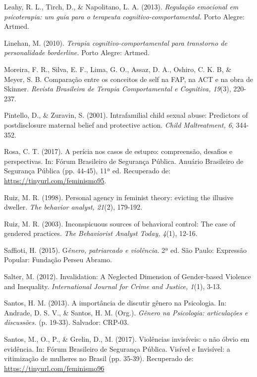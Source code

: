 \hangindent=25pt
\noindent Leahy, R. L., Tirch, D., \& Napolitano, L. A. (2013). \textit{Regulação emocional em psicoterapia: um guia para o terapeuta cognitivo-compor\-tamental.} Porto Alegre: Artmed.

\hangindent=25pt
\noindent Linehan, M. (2010). \textit{Terapia cognitivo-comportamental para transtorno de personalidade borderline.} Porto Alegre: Artmed. 

\hangindent=25pt
\noindent Moreira, F. R., Silva, E. F., Lima, G. O., Assaz, D. A., Oshiro, C. K. B, \& Meyer, S. B. Comparação entre os conceitos de self na FAP, na ACT e na obra de Skinner. \textit{Revista Brasileira de Terapia Comportamental e Cognitiva, 19}(3), 220-237.

\hangindent=25pt
\noindent Pintello, D., \& Zuravin, S. (2001). Intrafamilial child sexual abuse: Predictors of postdisclosure maternal belief and protective action. \textit{Child Maltreatment, 6}, 344-352.

\hangindent=25pt
\noindent Rosa, C. T. (2017). A perícia nos casos de estupro: compreensão, desafios e perspectivas. In: Fórum Brasileiro de Segurança Pública. Anuário Brasileiro de Segurança Pública (pp. 44-45), 11ª ed. Recuperado de: \url{https://tinyurl.com/feminismo95}.

\hangindent=25pt
\noindent Ruiz, M. R. (1998). Personal agency in feminist theory: evicting the illusive dweller. \textit{The behavior analyst, 21}(2), 179-192.

\hangindent=25pt
\noindent Ruiz, M. R. (2003). Inconspicuous sources of behavioral control: The case of gendered practices. \textit{The Behaviorist Analyst Today, 4}(1), 12-16. 

\hangindent=25pt
\noindent Saffioti, H. (2015). G\textit{ênero, patriarcado e violência.} 2ª ed. São Paulo: Expressão Popular: Fundação Perseu Abramo.

\hangindent=25pt
\noindent Salter, M. (2012). Invalidation: A Neglected Dimension of Gender‐based Violence and Inequality. \textit{International Journal for Crime and Justice, 1}(1), 3-13.

\hangindent=25pt
\noindent Santos, H. M. (2013). A importância de discutir gênero na Psicologia. In: Andrade, D. S. V., \& Santos, H. M. (Org.). \textit{Gênero na Psicologia: articulações e discussões.} (p. 19-33). Salvador: CRP-03.

\hangindent=25pt
\noindent Santos, M., O., P., \& Grelin, D., M. (2017). Violências invisíveis: o não óbvio em evidência. In: Fórum Brasileiro de Segurança Pública. Visível e Invisível: a vitimização de mulheres no Brasil (pp. 35-39). Recuperado de: \url{https://tinyurl.com/feminismo96}

